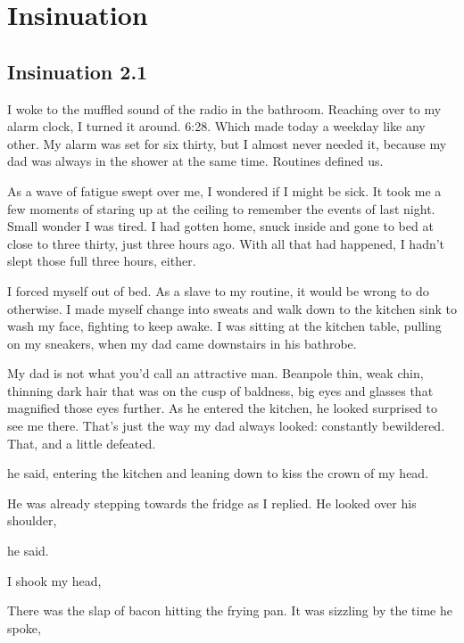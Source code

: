 
\part{Insinuation}

\chapter{Insinuation 2.1}

I woke to the muffled sound of the radio in the bathroom. Reaching over to my alarm clock, I turned it around. 6:28. Which made today a weekday like any other. My alarm was set for six thirty, but I almost never needed it, because my dad was always in the shower at the same time. Routines defined us.

As a wave of fatigue swept over me, I wondered if I might be sick. It took me a few moments of staring up at the ceiling to remember the events of last night. Small wonder I was tired. I had gotten home, snuck inside and gone to bed at close to three thirty, just three hours ago. With all that had happened, I hadn't slept those full three hours, either.

I forced myself out of bed. As a slave to my routine, it would be wrong to do otherwise. I made myself change into sweats and walk down to the kitchen sink to wash my face, fighting to keep awake. I was sitting at the kitchen table, pulling on my sneakers, when my dad came downstairs in his bathrobe.

My dad is not what you'd call an attractive man. Beanpole thin, weak chin, thinning dark hair that was on the cusp of baldness, big eyes and glasses that magnified those eyes further. As he entered the kitchen, he looked surprised to see me there. That's just the way my dad always looked: constantly bewildered. That, and a little defeated.

 he said, entering the kitchen and leaning down to kiss the crown of my head.


He was already stepping towards the fridge as I replied. He looked over his shoulder, 


 he said.

I shook my head, 

There was the slap of bacon hitting the frying pan. It was sizzling by the time he spoke, 

